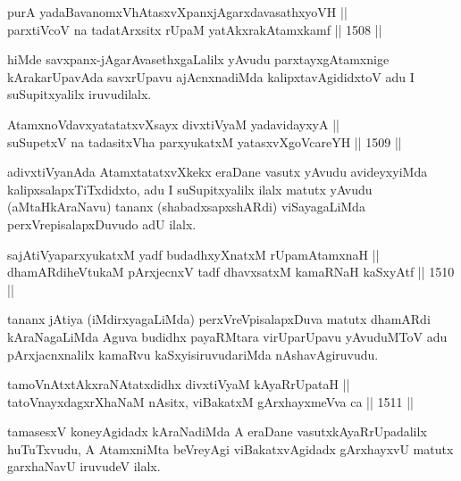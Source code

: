 
\begin{shl}
purA yadaBavanomxVhAtasxvXpanxjAgarxdavasathxyoVH || \\
parxtiVcoV na tadatArxsitx rUpaM yatAkxrakAtamxkamf ||  1508 ||  
\end{shl}

\begin{artha}
hiMde savxpanx-jAgarAvasethxgaLalilx yAvudu parxtayxgAtamxnige kArakarUpavAda savxrUpavu ajAcnxnadiMda kalipxtavAgididxtoV adu I suSupitxyalilx iruvudilalx.
\end{artha}


\begin{shl}
AtamxnoV\s davxyatatatxvXsayx divxtiVyaM yadavidayxyA ||  \\
suSupetxV na tadasitxVha parxyukatxM yatasxvXgoVcareYH ||  1509 ||  
\end{shl}

\begin{artha}
adivxtiVyanAda AtamxtatatxvXkekx eraDane vasutx yAvudu avideyxyiMda kalipxsalapxTiTxdidxto, adu I suSupitxyalilx ilalx matutx yAvudu (aMtaHkAraNavu) tananx (shabadxsapxshARdi) viSayagaLiMda perxVrepisalapxDuvudo adU ilalx.
\end{artha}

\begin{shl}
sajAtiVyaparxyukatxM yadf budadhxyXnatxM rUpamAtamxnaH || \\
dhamARdiheVtukaM pArxjecnxV tadf dhavxsatxM kamaRNaH kaSxyAtf ||  1510 || 
\end{shl}

\begin{artha}
tananx jAtiya (iMdirxyagaLiMda) perxVreVpisalapxDuva matutx dhamARdi kAraNagaLiMda Aguva budidhx payaRMtara virUparUpavu yAvuduMToV adu pArxjacnxnalilx kamaRvu kaSxyisiruvudariMda nAshavAgiruvudu.
\end{artha}

\begin{shl}
tamoVnAtxtAkxraNAtatxdidhx divxtiVyaM kAyaRrUpataH || \\
tatoV\s nayxdagxrXhaNaM nAsitx, viBakatxM gArxhayxmeVva ca ||  1511 ||  
\end{shl}

\begin{artha}
tamasesxV koneyAgidadx kAraNadiMda A eraDane vasutxkAyaRrUpadalilx huTuTxvudu, A AtamxniMta beVreyAgi viBakatxvAgidadx gArxhayxvU matutx garxhaNavU iruvudeV ilalx.
\end{artha}

